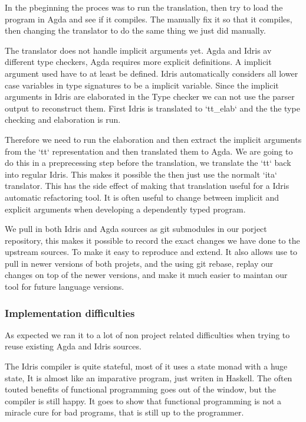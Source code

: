 \documentclass[parskip=half]{scrartcl}
\begin{document}
In the pbeginning the proces was to run the translation, then try to load the
program in Agda and see if it compiles. The manually fix it so that it
compiles, then changing the translator to do the same thing we just did
manually. %

The translator does not handle implicit arguments yet. Agda and Idris av
different type checkers, Agda requires more explicit definitions. A implicit
argument used have to at least be defined. Idris automatically considers all
lower case variables in type signatures to be a implicit variable. Since the
implicit arguments in Idris are elaborated in the Type checker we can not use
the parser output to reconstruct them. First Idris is translated to `tt_elab`
and the the type checking and elaboration is run.

Therefore we need to run the elaboration and then extract the implicit
arguments from the `tt` representation and then translated them to Agda. We are
going to do this in a preprecessing step before the translation, we translate
the `tt` back into regular Idris. This makes it possible the then just use the
normalt `ita` translator. This has the side effect of making that translation
useful for a Idris automatic refactoring tool. It is often useful to change
between implicit and explicit arguments when developing a dependently typed
program.


We pull in both Idris and Agda sources as git submodules in our porject
repository, this makes it possible to record the exact changes we have done to
the upstream sources. To make it easy to reproduce and extend. It also allows
use to pull in newer versions of both projets, and the using git rebase, replay
our changes on top of the newer versions, and make it much easier to maintan
our tool for future language versions.


\subsubsection{Implementation difficulties}
As expected we ran it to a lot of non project related difficulties when trying
to reuse existing Agda and Idris sources.

The Idris compiler is quite stateful, most of it uses a state monad with a huge
state, It is almost like an imparative program, just writen in Haskell. The
often touted benefits of functional programming goes out of the window, but the
compiler is still happy. It goes to show that functional programming is not
a miracle cure for bad programs, that is still up to the programmer.
\end{document}
